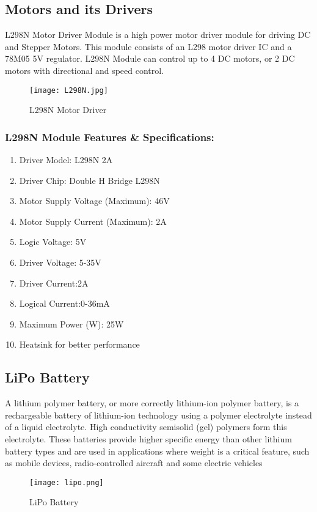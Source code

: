 \subsection{Motors and its Drivers}
L298N Motor Driver Module is a high power motor driver module for driving DC and Stepper Motors. This module consists of an L298 motor driver IC and a 78M05 5V regulator. L298N Module can control up to 4 DC motors, or 2 DC motors with directional and speed control.
\begin{figure}[h]
\centering
\texttt{[image: L298N.jpg]}
\caption{L298N Motor Driver}
\end{figure}
\subsubsection*{L298N Module Features \& Specifications:}
\begin{enumerate}
\item Driver Model: L298N 2A 
\item Driver Chip: Double H Bridge L298N 
\item Motor Supply Voltage (Maximum): 46V 
\item Motor Supply Current (Maximum): 2A 
\item Logic Voltage: 5V 
\item Driver Voltage: 5-35V 
\item Driver Current:2A 
\item Logical Current:0-36mA 
\item Maximum Power (W): 25W 
\item Heatsink for better performance 
\end{enumerate}

\subsection{LiPo Battery}
A lithium polymer battery, or more correctly lithium-ion polymer battery, is a rechargeable battery of lithium-ion technology using a polymer electrolyte instead of a liquid electrolyte. High conductivity semisolid (gel) polymers form this \\electrolyte. These batteries provide higher specific energy than other lithium battery types and are used in applications where weight is a critical feature, such as mobile devices, radio-controlled aircraft and some electric vehicles 
\begin{figure}[h]
\centering
\texttt{[image: lipo.png]}
\caption{LiPo Battery}
\end{figure}
